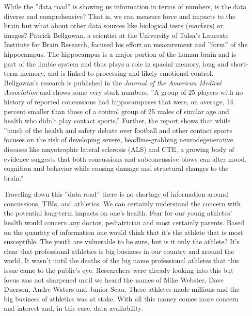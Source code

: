 \documentclass[sigconf]{acmart}
\begin{document}
While the ''data road'' is showing us information in terms of numbers, is the data diverse and comprehensive?  That is, we can measure force and impacts to the brain but what about other data sources like biological tests ({\em markers}) or images?  Patrick Bellgowan, a scientist at the University of Tulsa's Laureate Institute for Brain Research, focused his effort on measurement and ''form'' of the hippocampus.  The hippocampus is a major portion of the human brain and is part of the limbic system and thus plays a role in spacial memory, long and short-term memory, and is linked to processing and likely emotional control.  Bellgowan's research is published in the {\em Journal of the American Medical Association} and shows some very stark numbers. ''A group of 25 players with no history of reported concussions had hippocampuses that were, on average, 14 percent smaller than those of a control group of 25 males of similar age and health who didn't play contact sports.'' \cite{www-sportsonearth-com}  Further, the report shows that while ''much of the health and safety debate over football and other contact sports focuses on the risk of developing severe, headline-grabbing neurodegenerative diseases like amyotrophic lateral sclerosis (ALS) and CTE, a growing body of evidence suggests that both concussions and subconcussive blows can alter mood, cognition and behavior while causing damage and structural changes to the brain.'' \cite{www-sportsonearth-com}

Traveling down this ''data road'' there is no shortage of information around concussions, TBIs, and athletics.  We can certainly understand the concern with the potential long-term impacts on one's health.  Fear for our young athletes' health would concern any doctor, pediatrician and most certainly parents.  Based on the quantity of information one would think that it's the athlete that is most susceptible.  The youth are vulnerable to be sure, but is it only the athlete?  It's clear that professional athletics is big business in our country and around the world.  It wasn't until the deaths of the big name professional athletes that this issue came to the public's eye.  Researchers were already looking into this but focus was not sharpened until we heard the names of Mike Webster, Dave Duerson, Andre Waters and Junior Seau.  These athletes made millions and the big business of athletics was at stake.  With all this money comes more concern and interest and, in this case, data availability. 
\end{document}

